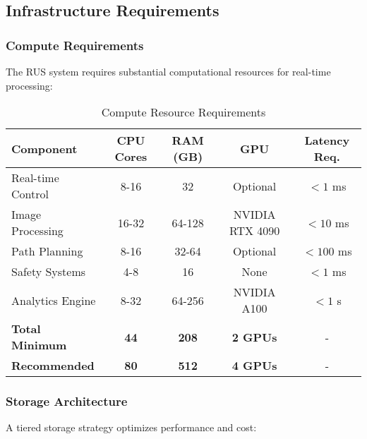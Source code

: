 \subsection{Infrastructure Requirements}

\subsubsection{Compute Requirements}
The RUS system requires substantial computational resources for real-time processing:

\begin{table}[htbp]
\centering
\caption{Compute Resource Requirements}
\label{tab:compute-requirements}
\begin{tabular}{|l|c|c|c|c|}
\hline
\textbf{Component} & \textbf{CPU Cores} & \textbf{RAM (GB)} & \textbf{GPU} & \textbf{Latency Req.} \\
\hline
Real-time Control & 8-16 & 32 & Optional & $< 1$ ms \\
Image Processing & 16-32 & 64-128 & NVIDIA RTX 4090 & $< 10$ ms \\
Path Planning & 8-16 & 32-64 & Optional & $< 100$ ms \\
Safety Systems & 4-8 & 16 & None & $< 1$ ms \\
Analytics Engine & 8-32 & 64-256 & NVIDIA A100 & $< 1$ s \\
\hline
\textbf{Total Minimum} & \textbf{44} & \textbf{208} & \textbf{2 GPUs} & - \\
\textbf{Recommended} & \textbf{80} & \textbf{512} & \textbf{4 GPUs} & - \\
\hline
\end{tabular}
\end{table}

\subsubsection{Storage Architecture}
A tiered storage strategy optimizes performance and cost:

